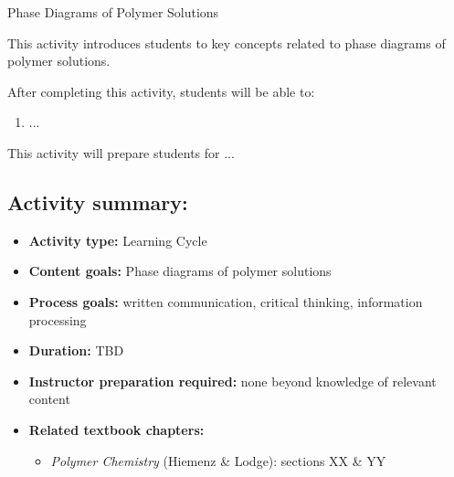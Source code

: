%
%
%
%

\renewcommand{\figpath}{content/polymphys/solution-thermo/phase-diagrams/figs}
\renewcommand{\labelbase}{phase-diagrams}

\begin{activity}{Phase Diagrams of Polymer Solutions}

\begin{instructornotes}

	This activity introduces students to key concepts related to phase diagrams of polymer solutions.
	
	After completing this activity, students will be able to:
			\begin{enumerate}
				\item ...
			\end{enumerate}
	This activity will prepare students for ...
			
	\subsection*{Activity summary:}
	\begin{itemize}
		\item \textbf{Activity type:} Learning Cycle
		\item \textbf{Content goals:} Phase diagrams of polymer solutions
		\item \textbf{Process goals:} %
			written communication, critical thinking, information processing
		\item \textbf{Duration:} TBD
		\item \textbf{Instructor preparation required:} none beyond knowledge of relevant content
		\item \textbf{Related textbook chapters:}
			\begin{itemize}
				\item \emph{Polymer Chemistry} (Hiemenz \& Lodge): sections XX \& YY
			\end{itemize}
	\end{itemize}


\end{instructornotes}
\end{activity}
